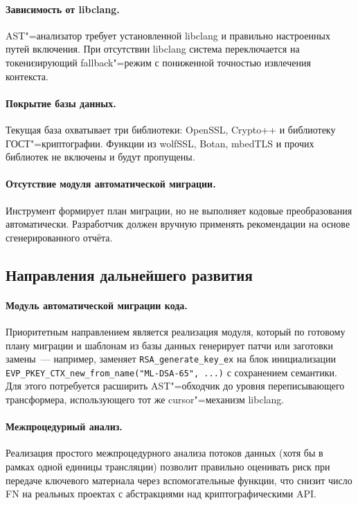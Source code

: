 \paragraph{Зависимость от libclang.}
AST"=анализатор требует установленной libclang и правильно настроенных
путей включения. При отсутствии libclang система переключается на
токенизирующий fallback"=режим с пониженной точностью извлечения контекста.

\paragraph{Покрытие базы данных.}
Текущая база охватывает три библиотеки: OpenSSL, Crypto++ и библиотеку
ГОСТ"=криптографии. Функции из wolfSSL, Botan, mbedTLS и прочих
библиотек не включены и будут пропущены.

\paragraph{Отсутствие модуля автоматической миграции.}
Инструмент формирует план миграции, но не выполняет кодовые
преобразования автоматически. Разработчик должен вручную применять
рекомендации на основе сгенерированного отчёта.

\subsection{Направления дальнейшего развития}

\paragraph{Модуль автоматической миграции кода.}
Приоритетным направлением является реализация модуля, который по
готовому плану миграции и шаблонам из базы данных генерирует
патчи или заготовки замены~--- например, заменяет
\texttt{RSA\_generate\_key\_ex} на блок инициализации
\texttt{EVP\_PKEY\_CTX\_new\_from\_name("ML-DSA-65", ...)} с
сохранением семантики.
Для этого потребуется расширить AST"=обходчик до уровня переписывающего
трансформера, использующего тот же cursor"=механизм libclang.

\paragraph{Межпроцедурный анализ.}
Реализация простого межпроцедурного анализа потоков данных (хотя бы
в рамках одной единицы трансляции) позволит правильно
оценивать риск при передаче ключевого материала через вспомогательные
функции, что снизит число FN на реальных проектах с абстракциями
над криптографическими API.

